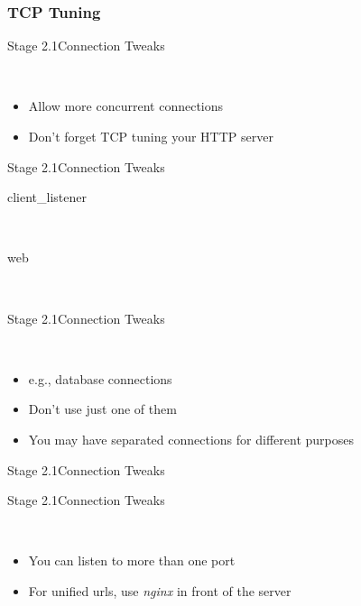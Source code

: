 \documentclass[utf8]{beamer}
\begin{document}
\subsubsection{TCP Tuning}
\begin{frame}{Stage 2.1}{Connection Tweaks}
	\begin{description}
		\item<+->[Backlog]\ \\
			\begin{itemize}
				\item Allow more concurrent connections
				\item Don't forget TCP tuning your HTTP server
			\end{itemize}
	\end{description}
\end{frame}
\begin{frame}{Stage 2.1}{Connection Tweaks}
	\begin{description}
		\item[client\_listener]~\\\backlog
		\item[web]~\\\backlogweb
	\end{description}
\end{frame}
\begin{frame}{Stage 2.1}{Connection Tweaks}
	\begin{description}
		\item<+->[Outbound Connections]\ \\
			\begin{itemize}
				\item e.g., database connections
				\item Don't use just one of them
				\item You may have separated connections for different purposes
			\end{itemize}
	\end{description}
\end{frame}
\begin{frame}{Stage 2.1}{Connection Tweaks}
\end{frame}
\begin{frame}{Stage 2.1}{Connection Tweaks}
	\begin{description}
		\item<+->[Listeners]\ \\
			\begin{itemize}
				\item You can listen to more than one port
				\item For unified urls, use \emph{nginx} in front of the server
			\end{itemize}
	\end{description}
\end{frame}
\end{document}
